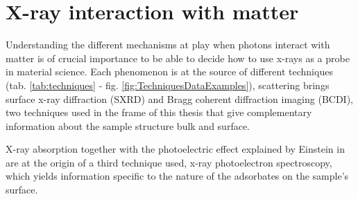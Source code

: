 \section{X-ray interaction with matter} \label{sec:XRIntMatter}

Understanding the different mechanisms at play when photons interact with matter is of crucial importance to be able to decide how to use x-rays as a probe in material science.
Each phenomenon is at the source of different techniques (tab. \ref{tab:techniques} - fig. \ref{fig:TechniquesDataExamples}), scattering brings surface x-ray diffraction (SXRD) and Bragg coherent diffraction imaging (BCDI), two techniques used in the frame of this thesis that give complementary information about the sample structure bulk and surface.

X-ray absorption together with the photoelectric effect explained by Einstein in \cite*{Einstein1905} are at the origin of a third technique used, x-ray photoelectron spectroscopy, which yields information specific to the nature of the adsorbates on the sample's surface.

\begin{table}[!htb]
\centering
{}
    \caption{
        X-ray techniques carried out in the frame of this thesis.
    }
    \label{tab:techniques}
\end{table}

